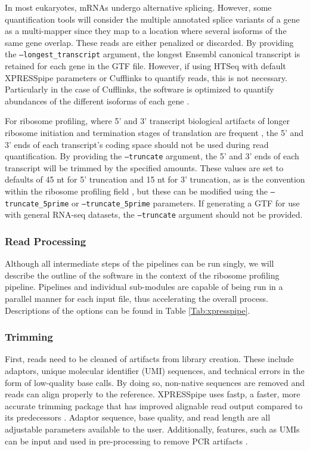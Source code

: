 \documentclass[11pt, a4paper, oneside]{article}
\begin{document}
In most eukaryotes, mRNAs undergo alternative splicing. However, some quantification tools will consider the multiple annotated splice variants of a gene as a multi-mapper since they map to a location where several isoforms of the same gene overlap. These reads are either penalized or discarded. By providing the \texttt{--longest\_transcript} argument, the longest Ensembl canonical transcript \cite{ensembl_canon} is retained for each gene in the GTF file. However, if using HTSeq with default XPRESSpipe parameters or Cufflinks to quantify reads, this is not necessary. Particularly in the case of Cufflinks, the software is optimized to quantify abundances of the different isoforms of each gene \cite{cufflinks}. \par

For ribosome profiling, where 5' and 3' transcript biological artifacts of longer ribosome initiation and termination stages of translation are frequent \cite{ingolia_meth, weinberg_reports}, the 5' and 3' ends of each transcript's coding space should not be used during read quantification. By providing the \texttt{--truncate} argument, the 5' and 3' ends of each transcript will be trimmed by the specified amounts. These values are set to defaults of 45 nt for 5' truncation and 15 nt for 3' truncation, as is the convention within the ribosome profiling field \cite{ingolia_meth}, but these can be modified using the \texttt{--truncate\_5prime} or \texttt{--truncate\_5prime} parameters. If generating a GTF for use with general RNA-seq datasets, the \texttt{--truncate} argument should not be provided.

\subsubsection{Read Processing}
Although all intermediate steps of the pipelines can be run singly, we will describe the outline of the software in the context of the ribosome profiling pipeline. Pipelines and individual sub-modules are capable of being run in a parallel manner for each input file, thus accelerating the overall process. Descriptions of the options can be found in Table \ref{Tab:xpresspipe}.

\subsubsection{Trimming}
First, reads need to be cleaned of artifacts from library creation. These include adaptors, unique molecular identifier (UMI) sequences, and technical errors in the form of low-quality base calls. By doing so, non-native sequences are removed and reads can align properly to the reference. XPRESSpipe uses fastp, a faster, more accurate trimming package that has improved alignable read output compared to its predecessors \cite{fastp}. Adaptor sequence, base quality, and read length are all adjustable parameters available to the user. Additionally, features, such as UMIs can be input and used in pre-processing to remove PCR artifacts \cite{umi}.
\end{document}
